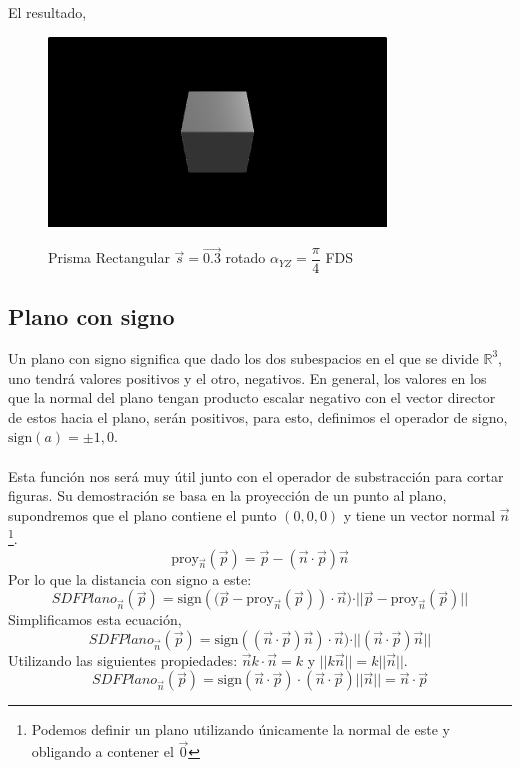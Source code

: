 El resultado,
\begin{figure}[H]
  \centering
  \captionsetup{justification=centering}%
  \includegraphics[width=0.8\textwidth]{secciones/imagenes/sdf/3d/sdf_prisma_rect.png}\label{fig:prisma}
  \caption{Prisma Rectangular \(\Vec{s}=\Vec{0.3}\) rotado \(\alpha_{YZ}=\dfrac{\pi}{4}\) FDS}
\end{figure}

\subsection{Plano con signo}
Un plano con signo significa que dado los dos subespacios en el que se divide \(\mathbb{R}^3\), uno tendrá valores positivos y el otro, negativos. En general, los valores en los que la normal del plano tengan producto escalar negativo con el vector director de estos hacia el plano, serán positivos, para esto, definimos el operador de signo, \(\text{sign}(a)=\pm 1, 0\).\\\\
Esta función nos será muy útil junto con el operador de substracción para cortar figuras. Su demostración se basa en la proyección de un punto al plano, supondremos que el plano contiene el punto \((0,0,0)\) y tiene un vector normal \(\Vec{n}\) \footnote{Podemos definir un plano utilizando únicamente la normal de este y obligando a contener el \(\Vec{0}\)}.
\[\text{proy}_{\Vec{n}}(\Vec{p}) = \Vec{p} - (\Vec{n}\cdot\Vec{p})\Vec{n} \]
Por lo que la distancia con signo a este:
\[ SDFPlano_{\Vec{n}}(\Vec{p})=\text{sign}\left((\Vec{p}-\text{proy}_{\Vec{n}}(\Vec{p})\right) \cdot \Vec{n})\cdot \vert \vert \Vec{p} - \text{proy}_{\Vec{n}}(\Vec{p}) \vert\vert \]
Simplificamos esta ecuación,
\[ SDFPlano_{\Vec{n}}(\Vec{p}) = \text{sign}\left((\Vec{n}\cdot\Vec{p})\Vec{n}\right) \cdot \Vec{n})\cdot \vert \vert (\Vec{n}\cdot\Vec{p})\Vec{n}  \vert\vert \]
Utilizando las siguientes propiedades: \(\Vec{n}k\cdot\Vec{n}=k\) y \(\vert\vert k\Vec{n}\vert\vert=k\vert\vert\Vec{n}\vert\vert\).
\[ SDFPlano_{\Vec{n}}(\Vec{p})=\text{sign}\left(\Vec{n}\cdot\Vec{p}\right)\cdot (\Vec{n}\cdot\Vec{p}) \vert \vert\Vec{n}\vert\vert=\Vec{n}\cdot\Vec{p}\]

